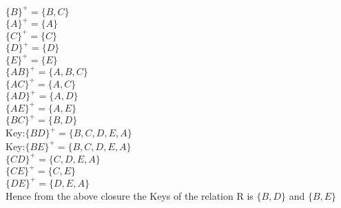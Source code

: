 
$\{B\}^+ = \{ B,C\}$ \\
$\{A\}^+ = \{ A\}$ \\
$\{C\}^+ = \{ C\}$ \\
$\{D\}^+ = \{ D\}$ \\
$\{E\}^+ = \{ E\}$ \\
$\{AB\}^+ = \{A,B,C\}$ \\
$\{AC\}^+ = \{ A,C\}$ \\
$\{AD\}^+ = \{A,D\}$ \\
$\{AE\}^+ = \{ A,E\}$ \\
$\{BC\}^+ = \{B,D\}$ \\
Key:$\{BD\}^+ = \{ B,C,D,E,A\}$ \\
Key:$\{BE\}^+ = \{B,C,D,E,A\}$ \\
$\{CD\}^+ = \{ C,D,E,A\}$ \\
$\{CE\}^+ = \{ C,E\}$ \\
$\{DE\}^+ = \{ D,E,A\}$ \\

Hence from the above closure the Keys of the relation R is $\{B,D\}$ and $\{B,E\}$